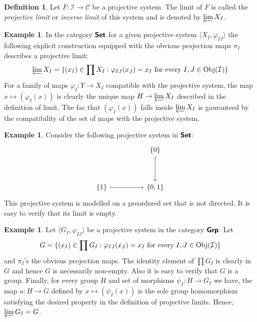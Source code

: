 \documentclass[12pt]{article}
\theoremstyle{definition}
\newtheorem{dfn}[thm]{Definition}
\newtheorem{exm}[thm]{Example}
\theoremstyle{remark}
\newcommand{\catvar}[1]{\mathcal{#1}}
\newcommand{\CC}{\catvar{C}}
\newcommand{\II}{\catvar{I}}
\newcommand{\catname}[1]{\textup{\sffamily\textbf{#1}}}
\newcommand*{\Set}{\catname{Set}}
\newcommand*{\Grp}{\catname{Grp}}
\newcommand{\Obj}[1]{\textup{Obj}(#1)}
\begin{document}
    \begin{dfn}
        Let $F\colon \II\to\CC$ be a projective system. The limit of $F$ is called the \emph{projective limit} or \emph{inverse limit} of this system and is denoted by $\varprojlim X_I$.
    \end{dfn}

    \begin{exm}
        In the category $\Set$ for a given projective system $\langle X_I,\varphi_{IJ}\rangle$ the following explicit construction equipped with the obvious projection maps $\pi_I$ describes a projective limit:
        $$
            \varprojlim X_I = \{(x_I)\in\prod X_I : \varphi_{IJ}(x_J)=x_I\ \textup{for every}\ I,J\in\Obj{\II}\}
        $$
        For a family of maps $\varphi_I\colon Y\to X_I$ compatible with the projective system, the map $x\mapsto (\varphi_I(x))$ is clearly the unique map $H\to\varprojlim X_I$ described in the definition of limit. The fac that $(\varphi_I(x))$ falls inside $\varprojlim X_I$ is gauranteed by the compatibility of the set of maps with the projective system.
    \end{exm}

    \begin{exm}\label{exm:emp}
        Consider the following projective system in $\Set$:
        \[\begin{tikzcd}
            && {\{0\}} \\
            \\
            {\{1\}} && {\{0,1\}}
            \arrow[hook, from=1-3, to=3-3]
            \arrow[hook, from=3-1, to=3-3]
        \end{tikzcd}\]
        This projective system is modelled on a preordered set that is not directed. It is easy to verify that its limit is empty.
    \end{exm}

    \begin{exm}
        Let $\langle G_I,\varphi_{IJ}\rangle$ be a projective system in the category $\Grp$. Let
        $$
             G = \{(x_I)\in\prod G_I : \varphi_{IJ}(x_J)=x_I\ \textup{for every}\ I,J\in\Obj{\II}\}
        $$
        and $\pi_I$'s the obvious projection maps. The identity element of $\prod G_I$ is clearly in $G$ and hence $G$ is necessarily non-empty. Also it is easy to verify that $G$ is a group. Finally, for every group $H$ and set of morphisms $\psi_I\colon H\to G_I$ we have, the map $u\colon H\to G$ defined by $x\mapsto (\psi_I(x))$ is the sole group homomorphism satisfying the desired property in the definition of projective limits. Hence, $\varprojlim G_I=G$. 
    \end{exm}
\end{document}
